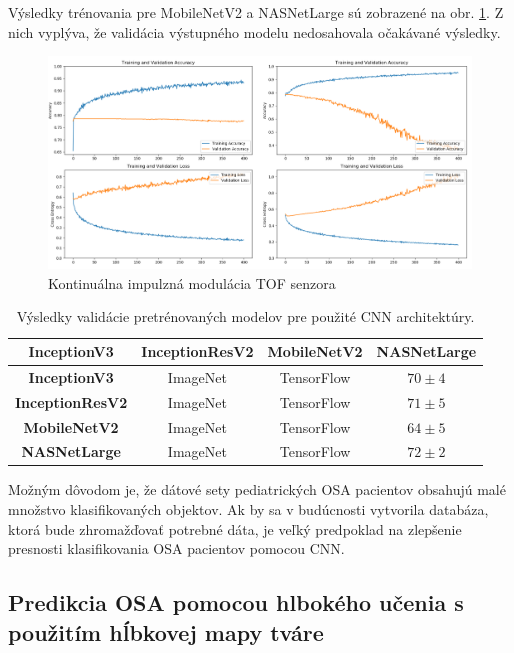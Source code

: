 Výsledky trénovania pre MobileNetV2 a NASNetLarge sú zobrazené na obr. \ref{fig:resers:d}. Z nich vyplýva, že validácia výstupného modelu nedosahovala očakávané výsledky. 


\begin{figure}[h]
	\centering
	\includegraphics[width=\textwidth]{figures/resers_d.png}
	\caption{Kontinuálna impulzná modulácia TOF senzora}
	\label{fig:resers:d}
\end{figure}


\begin{table}[H]
	\caption{\label{tab:final_comp} Výsledky validácie pretrénovaných modelov pre použité CNN architektúry. }
	\centering
	\begin{tabular}{cccc}
		\toprule
		\textbf{InceptionV3} & \textbf{InceptionResV2} & \textbf{MobileNetV2} & \textbf{NASNetLarge}     \\ 
		\midrule
		\textbf{InceptionV3}           & ImageNet     	& TensorFlow    & $70 \pm 4$		\\ 
		\textbf{InceptionResV2}        & ImageNet		& TensorFlow  	& $71 \pm 5$		\\ 
		\textbf{MobileNetV2}           & ImageNet     	& TensorFlow    & $64 \pm 5$		\\ 
		\textbf{NASNetLarge}           & ImageNet     	& TensorFlow    & $72 \pm 2$		\\ 
		\bottomrule
	\end{tabular}
\end{table}

Možným dôvodom je, že dátové sety pediatrických OSA pacientov obsahujú malé množstvo klasifikovaných objektov. Ak by sa v budúcnosti vytvorila databáza, ktorá bude zhromažďovať potrebné dáta, je veľký predpoklad na zlepšenie presnosti klasifikovania OSA pacientov pomocou CNN.


\subsection{Predikcia OSA pomocou hlbokého učenia s použitím hĺbkovej mapy tváre}

